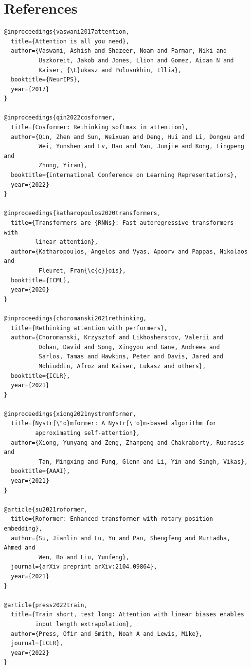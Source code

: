 
\section{References}

\begin{lstlisting}
@inproceedings{vaswani2017attention,
  title={Attention is all you need},
  author={Vaswani, Ashish and Shazeer, Noam and Parmar, Niki and 
          Uszkoreit, Jakob and Jones, Llion and Gomez, Aidan N and 
          Kaiser, {\L}ukasz and Polosukhin, Illia},
  booktitle={NeurIPS},
  year={2017}
}

@inproceedings{qin2022cosformer,
  title={Cosformer: Rethinking softmax in attention},
  author={Qin, Zhen and Sun, Weixuan and Deng, Hui and Li, Dongxu and 
          Wei, Yunshen and Lv, Bao and Yan, Junjie and Kong, Lingpeng and 
          Zhong, Yiran},
  booktitle={International Conference on Learning Representations},
  year={2022}
}

@inproceedings{katharopoulos2020transformers,
  title={Transformers are {RNNs}: Fast autoregressive transformers with 
         linear attention},
  author={Katharopoulos, Angelos and Vyas, Apoorv and Pappas, Nikolaos and 
          Fleuret, Fran{\c{c}}ois},
  booktitle={ICML},
  year={2020}
}

@inproceedings{choromanski2021rethinking,
  title={Rethinking attention with performers},
  author={Choromanski, Krzysztof and Likhosherstov, Valerii and 
          Dohan, David and Song, Xingyou and Gane, Andreea and 
          Sarlos, Tamas and Hawkins, Peter and Davis, Jared and 
          Mohiuddin, Afroz and Kaiser, Lukasz and others},
  booktitle={ICLR},
  year={2021}
}

@inproceedings{xiong2021nystromformer,
  title={Nystr{\"o}mformer: A Nystr{\"o}m-based algorithm for 
         approximating self-attention},
  author={Xiong, Yunyang and Zeng, Zhanpeng and Chakraborty, Rudrasis and 
          Tan, Mingxing and Fung, Glenn and Li, Yin and Singh, Vikas},
  booktitle={AAAI},
  year={2021}
}

@article{su2021roformer,
  title={Roformer: Enhanced transformer with rotary position embedding},
  author={Su, Jianlin and Lu, Yu and Pan, Shengfeng and Murtadha, Ahmed and 
          Wen, Bo and Liu, Yunfeng},
  journal={arXiv preprint arXiv:2104.09864},
  year={2021}
}

@article{press2022train,
  title={Train short, test long: Attention with linear biases enables 
         input length extrapolation},
  author={Press, Ofir and Smith, Noah A and Lewis, Mike},
  journal={ICLR},
  year={2022}
}


\end{lstlisting}
